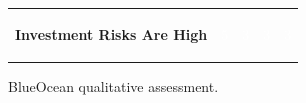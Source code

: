 \documentclass[10pt,a4paper]{article}
\begin{document}
{\begin{tabular}{p{38mm}>{\centering\arraybackslash}p{21mm}>{\centering\arraybackslash}p{21mm}>{\centering\arraybackslash}p{21mm}>{\centering\arraybackslash}p{21mm}}
{\bfseries Investment Risks Are High} & \colorbox{BOGreen}{\textcolor{white}{\strut\hspace{5pt}5\hspace{5pt}}} & \colorbox{BOBlue}{\textcolor{white}{\strut\hspace{5pt}3\hspace{5pt}}} & \colorbox{BOBlue}{\textcolor{white}{\strut\hspace{5pt}3\hspace{5pt}}} & \colorbox{BOBlue}{\textcolor{white}{\strut\hspace{5pt}3\hspace{5pt}}} \\
\end{tabular}}\par\vspace{2pt}
\par
{\scriptsize\color{BOMuted} BlueOcean qualitative assessment.}\par
\end{document}

